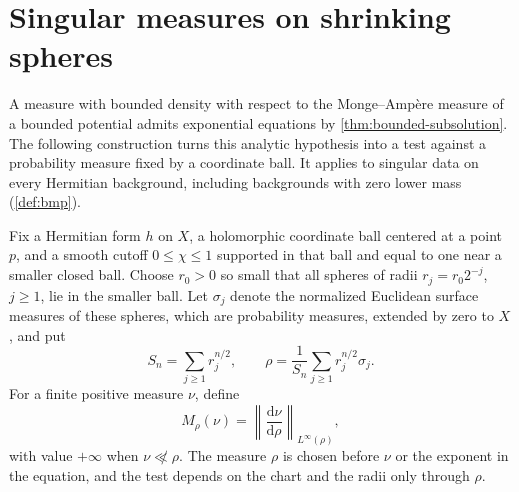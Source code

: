\section{Singular measures on shrinking spheres}
\label{sec:fixed-spherical-equations}

A measure with bounded density with respect to the Monge--Amp\`ere measure of a bounded potential admits exponential equations by \cref{thm:bounded-subsolution}. The following construction turns this analytic hypothesis into a test against a probability measure fixed by a coordinate ball. It applies to singular data on every Hermitian background, including backgrounds with zero lower mass (\cref{def:bmp}).

Fix a Hermitian form $h$ on $X$, a holomorphic coordinate ball centered at a point $p$, and a smooth cutoff $0\leq\chi\leq1$ supported in that ball and equal to one near a smaller closed ball. Choose $r_0>0$ so small that all spheres of radii $r_j=r_0 2^{-j}$, $j\geq1$, lie in the smaller ball. Let $\sigma_j$ denote the normalized Euclidean surface measures of these spheres, which are probability measures, extended by zero to $X$, and put
\begin{equation}\label{eq:fixed-spherical-probability}
 S_n=\sum_{j\geq1}r_j^{n/2},\qquad
 \rho=\frac1{S_n}\sum_{j\geq1}r_j^{n/2}\sigma_j.
\end{equation}
For a finite positive measure $\nu$, define
\[
 M_\rho(\nu)=\left\|\frac{\mathrm d\nu}{\mathrm d\rho}\right\|_{L^\infty(\rho)},
\]
with value $+\infty$ when $\nu\not\ll\rho$. The measure $\rho$ is chosen before $\nu$ or the exponent in the equation, and the test depends on the chart and the radii only through $\rho$.

